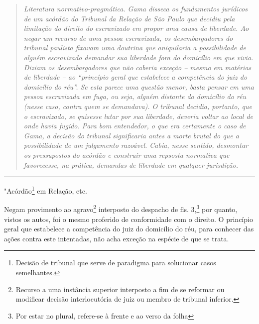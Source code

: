 \begin{quote}
\emph{Literatura normativo-pragmática. Gama disseca os fundamentos
jurídicos de um acórdão do Tribunal da Relação de São Paulo que decidiu
pela limitação do direito do escravizado em propor uma causa de
liberdade. Ao negar um recurso de uma pessoa escravizada, os
desembargadores do tribunal paulista fixavam uma doutrina que
aniquilaria a possibilidade de alguém escravizado demandar sua liberdade
fora do domicílio em que vivia. Diziam os desembargadores que não
caberia exceção -- mesmo em matérias de liberdade -- ao ``princípio
geral que estabelece a competência do juiz do domicílio do réu''. Se
esta parece uma questão menor, basta pensar em uma pessoa escravizada em
fuga, ou seja, alguém distante do domicílio do réu (nesse caso, contra
quem se demandava). O tribunal decidia, portanto, que o escravizado, se
quisesse lutar por sua liberdade, deveria voltar ao local de onde havia
fugido. Para bom entendedor, o que era certamente o caso de Gama, a
decisão do tribunal significaria antes a morte brutal do que a
possibilidade de um julgamento razoável. Cabia, nesse sentido, desmontar
os pressupostos do acórdão e construir uma repsosta normativa que
favorecesse, na prática, demandas de liberdade em qualquer jurisdição. }
\end{quote}

\begin{center}\rule{0.5\linewidth}{\linethickness}\end{center}

"Acórdão\footnote{Decisão de tribunal que serve de paradigma para
  solucionar casos semelhantes.} em Relação, etc.

Negam provimento ao agravo\footnote{Recurso a uma instância superior
  interposto a fim de se reformar ou modificar decisão interlocutória de
  juiz ou membro de tribunal inferior.} interposto do despacho de fls.
3,\footnote{Por estar no plural, refere-se à frente e ao verso da folha}
por quanto, vistos os autos, foi o mesmo proferido de conformidade com o
direito. O princípio geral que estabelece a competência do juiz do
domicílio do réu, para conhecer das ações contra este intentadas, não
acha exceção na espécie de que se trata.

